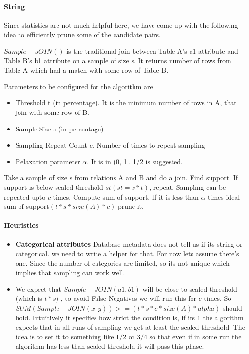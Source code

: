 \documentclass{article}
\begin{document}
\paragraph{String}

Since statistics are not much helpful here, we have come up with the following idea to efficiently prune some of the candidate pairs.

$Sample-JOIN()$ is the traditional join between Table A's a1 attribute and Table B's b1 attribute on a sample of size s.  It returns number of rows from Table A which had a match with some row of Table B.

Parameters to be configured for the algorithm are
\begin{itemize}
\item Threshold t (in percentage). It is the minimum number of rows in A, that join with some row of B.
\item Sample Size s (in percentage)
\item Sampling Repeat Count c. Number of times to repeat sampling
\item Relaxation parameter $\alpha$. It is in (0, 1]. 1/2 is suggested.
\end{itemize}

Take a sample of size s from relations A and B and do a join. Find support. If support is below scaled threshold $st( st = s * t)$, repeat. Sampling can be repeated upto $c$ times.
Compute sum of support. If it is less than $\alpha$ times ideal sum of support$(t * s * size(A) * c)$ prune it.

\paragraph{Heuristics}
\begin{itemize}


\item \textbf{Categorical attributes} Database metadata does not tell us if its string or categorical. we need to write a helper for that. For now lets assume there's one. 	         Since the number of categories are limited, so its not unique which implies that sampling can work well.

\item We expect that $Sample-JOIN(a1,b1)$ will be close to scaled-threshold (which is $t * s$) , to avoid False Negatives we will run this for $c$ times. So $SUM(Sample-JOIN(x,y)) >= (t * s * c * size(A) * alpha)$ should hold. Intuitively it specifies how strict the condition is, if its 1 the algorithm expects that in all runs of sampling we get at-least the scaled-threshold.  The idea is to set it to something like $1/2$ or $3/4$ so that even if in some run the algorithm has less than scaled-threshold it will pass this phase.
\end{itemize}
\end{document}
